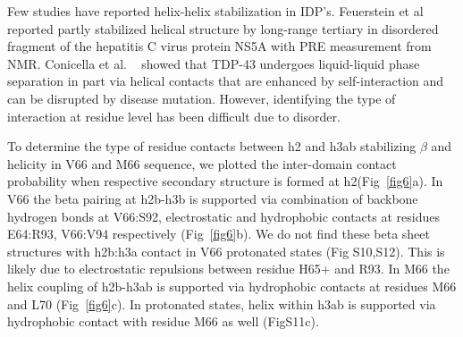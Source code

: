 \documentclass[journal=jacsat,manuscript=article]{achemso}
\begin{document}
Few studies have reported helix-helix stabilization in IDP's. Feuerstein et al ~\cite {Feuerstein2012} reported partly stabilized helical structure by long-range tertiary in disordered fragment of the hepatitis C virus protein NS5A with PRE measurement from NMR. Conicella et al. ~\cite {AlexanderConicella2016} showed that TDP-43 undergoes liquid-liquid phase separation in part via helical contacts that are enhanced by self-interaction and can be disrupted by disease mutation. However, identifying the type of interaction at residue level has been difficult due to disorder.

To determine the type of residue contacts between h2 and h3ab stabilizing $\beta$ and helicity in V66 and M66 sequence, we plotted the inter-domain contact probability when respective secondary structure is formed at h2(Fig~\ref{fig6}a). In V66 the beta pairing at h2b-h3b is supported via combination of backbone hydrogen bonds at V66:S92, electrostatic and hydrophobic contacts at residues E64:R93, V66:V94 respectively (Fig~\ref{fig6}b). We do not find these beta sheet structures with h2b:h3a contact in V66 protonated states (Fig S10,S12). This is likely due to electrostatic repulsions between residue H65+ and R93.
In M66 the helix coupling of h2b-h3ab is supported via hydrophobic contacts at residues M66 and L70 (Fig~\ref{fig6}c). In protonated states, helix within h3ab is supported via hydrophobic contact with residue M66 as well (FigS11c).


\clearpage

\end{document}
